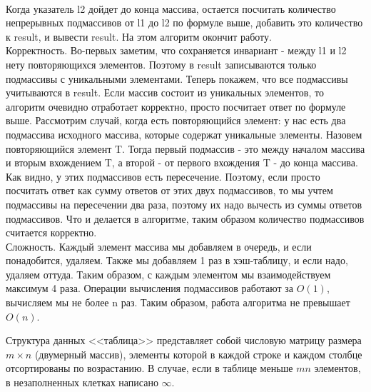 \documentclass[12pt]{extreport}
\theoremstyle{definiton}
\theoremstyle{definition}
\theoremstyle{definition}
\def\prend{
	\medskip
}
\begin{document}
	 \\ Когда указатель l2 дойдет до конца массива, остается посчитать количество непрерывных подмассивов от l1 до l2 по формуле выше, добавить это количество к result, и вывести result. На этом алгоритм окончит работу.
	 \\Корректность. Во-первых заметим, что сохраняется инвариант - между l1 и l2 нету повторяющихся элементов. Поэтому в result записываются только подмассивы с уникальными элементами. Теперь покажем, что все подмассивы учитываются в result. Если массив состоит из уникальных элементов, то алгоритм очевидно отработает корректно, просто посчитает ответ по формуле выше. Рассмотрим случай, когда есть повторяющийся элемент: у нас есть два подмассива исходного массива, которые содержат уникальные элементы. Назовем повторяющийся элемент T. Тогда первый подмассив - это между началом массива и вторым вхождением T, а второй - от первого вхождения T - до конца массива. Как видно, у этих подмассивов есть пересечение. Поэтому, если просто посчитать ответ как сумму ответов от этих двух подмассивов, то мы учтем подмассивы на пересечении два раза, поэтому их надо вычесть из суммы ответов подмассивов. Что и делается в алгоритме, таким образом количество подмассивов считается корректно.
	 \\ Сложность. Каждый элемент массива мы добавляем в очередь, и если понадобится, удаляем. Также мы добавляем 1 раз в хэш-таблицу, и если надо, удаляем оттуда. Таким образом, с каждым элементом мы взаимодействуем максимум 4 раза. Операции вычисления подмассивов работают за $O(1)$, вычисляем мы не более n раз. Таким образом, работа алгоритма не превышает $O(n)$.


	 \prend

	 \Pr[4] Структура данных <<таблица>> представляет собой числовую матрицу размера $m\times n$ (двумерный массив), элементы которой в каждой строке и каждом столбце отсортированы по возрастанию. В случае, если в таблице меньше $mn$ элементов, в незаполненных клетках написано $\infty$.
\end{document}
